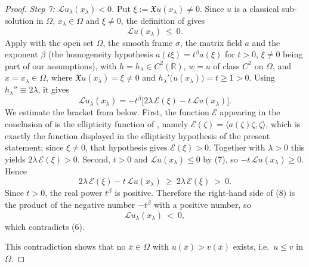 \begin{proof}
\emph{Step 7: $\mathcal{L}u_\lambda(x_\lambda)<0$.} Put $\xi:=\mathfrak{X}u(x_\lambda)\neq0$.
Since $u$ is a classical sub-solution in $\Omega$, $x_\lambda\in\Omega$ and $\xi\neq0$, the
definition of  gives
\begin{equation*}\mathcal{L}u(x_\lambda)\ \leq\ 0. \tag{7}\end{equation*}
Apply  with the open set $\Omega$, the smooth frame $\sigma$, the
matrix field $a$ and the exponent $\beta$ (the homogeneity hypothesis $a(t\xi)=t^\beta a(\xi)$ for
$t>0$, $\xi\neq0$ being part of our assumptions), with $h=h_\lambda\in C^2(\mathbb{R})$, $w=u$ of
class $C^2$ on $\Omega$, and $x=x_\lambda\in\Omega$, where
$\mathfrak{X}u(x_\lambda)=\xi\neq0$ and $h_\lambda'\big(u(x_\lambda)\big)=t\geq1>0$. Using
$h_\lambda''\equiv2\lambda$, it gives
\begin{equation*}\mathcal{L}u_\lambda(x_\lambda)=-t^{\beta}\Big[2\lambda\,\mathcal{E}(\xi)
-t\,\mathcal{L}u(x_\lambda)\Big]. \tag{8}\end{equation*}
We estimate the bracket from below. First, the function $\mathcal{E}$ appearing in the conclusion
of  is the ellipticity function of , namely
$\mathcal{E}(\zeta)=\langle a(\zeta)\zeta,\zeta\rangle$, which is exactly the function displayed in
the ellipticity hypothesis of the present statement; since $\xi\neq0$, that hypothesis gives
$\mathcal{E}(\xi)>0$. Together with $\lambda>0$ this yields $2\lambda\,\mathcal{E}(\xi)>0$.
Second, $t>0$ and $\mathcal{L}u(x_\lambda)\leq0$ by (7), so
$-t\,\mathcal{L}u(x_\lambda)\geq0$. Hence
$$2\lambda\,\mathcal{E}(\xi)-t\,\mathcal{L}u(x_\lambda)\ \geq\ 2\lambda\,\mathcal{E}(\xi)\ >\ 0 .$$
Since $t>0$, the real power $t^{\beta}$ is positive. Therefore the right-hand side of (8) is the
product of the negative number $-t^\beta$ with a positive number, so
$$\mathcal{L}u_\lambda(x_\lambda)\ <\ 0,$$
which contradicts (6).

This contradiction shows that no $\bar x\in\Omega$ with $u(\bar x)>v(\bar x)$ exists, i.e.\
$u\leq v$ in $\Omega$.
\end{proof}
